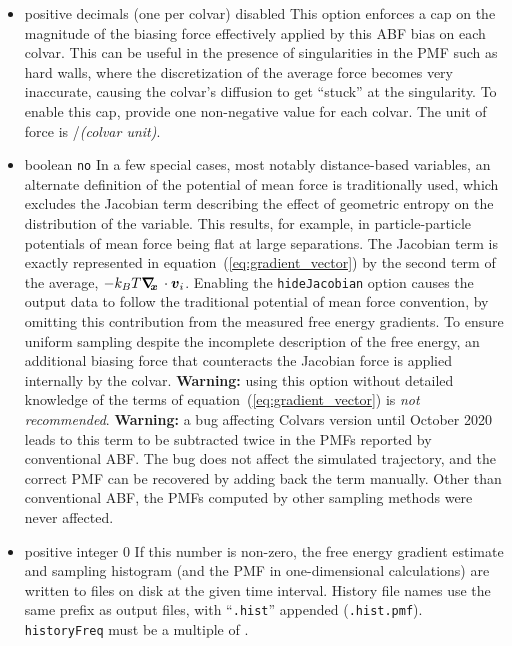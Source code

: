 \begin{itemize}
\item {}
  {positive decimals (one per colvar)}
  {disabled}
  {This option enforces a cap on the magnitude of the biasing force effectively applied
   by this ABF bias on each colvar. This can be useful in the presence of singularities
   in the PMF such as hard walls, where the discretization of the average force becomes
   very inaccurate, causing the colvar's diffusion to get ``stuck'' at the singularity.
   To enable this cap, provide one non-negative value for each colvar. The unit of force
   is \energyunit/\textit{(colvar unit)}.}

\item {}
  {boolean}
  {\texttt{no}}
  {In a few special cases, most notably distance-based variables, an alternate definition of
    the potential of mean force is traditionally used, which excludes the Jacobian
    term describing the effect of geometric entropy on the distribution of the variable.
    This results, for example, in particle-particle potentials of mean force being flat
    at large separations.
    The Jacobian term is exactly represented in equation~(\ref{eq:gradient_vector}) by the second term
    of the average, $ - k_B T \mbox{\boldmath$\nabla_{\!\!x}\,$} \cdot {\mbox{\boldmath{$v$}}}_{i} $.
    Enabling the \texttt{hideJacobian} option causes the output data to follow the traditional
    potential of mean force convention,
    by omitting this contribution from the measured free energy gradients.
    To ensure uniform sampling despite the incomplete description of the free energy, an
    additional biasing force that counteracts the Jacobian force is applied internally by the
    colvar.
    \textbf{Warning:} using this option without detailed knowledge of the terms of equation~(\ref{eq:gradient_vector}) is \emph{not recommended}.
    \textbf{Warning:} a bug affecting Colvars version until October 2020 leads to this term to be subtracted twice in the PMFs reported by conventional ABF.
    The bug does not affect the simulated trajectory, and the correct PMF can be recovered by adding back the term manually.
    Other than conventional ABF, the PMFs computed by other sampling methods were never affected.}

\item {}
  {positive integer}
  {0}
  {If this number is non-zero, the free energy gradient estimate and sampling histogram
    (and the PMF in one-dimensional calculations) are written to files on disk at
    the given time interval. History file names use the same prefix as output files, with
    ``\texttt{.hist}'' appended (\outputName\texttt{.hist.pmf}).
  \texttt{historyFreq} must be a multiple of .}


\end{itemize}
